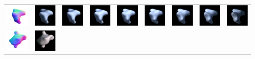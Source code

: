 \begin{center}
\begin{longtable}{@{}c@{}c@{}c@{}c@{}c@{}c@{}c@{}c@{}c@{}}
\includegraphics[width=0.1\linewidth]{training/32_gt.png} & \includegraphics[width=0.1\linewidth]{training/32_0.png} &
\includegraphics[width=0.1\linewidth]{training/32_1.png} & \includegraphics[width=0.1\linewidth]{training/32_2.png} &
\includegraphics[width=0.1\linewidth]{training/32_3.png} & \includegraphics[width=0.1\linewidth]{training/32_4.png} &
\includegraphics[width=0.1\linewidth]{training/32_5.png} & \includegraphics[width=0.1\linewidth]{training/32_6.png} &
\includegraphics[width=0.1\linewidth]{training/32_7.png} \\
\includegraphics[width=0.1\linewidth]{training/33_gt.png} & \includegraphics[width=0.1\linewidth]{training/33_0.png} &

\end{longtable}
\end{center}
